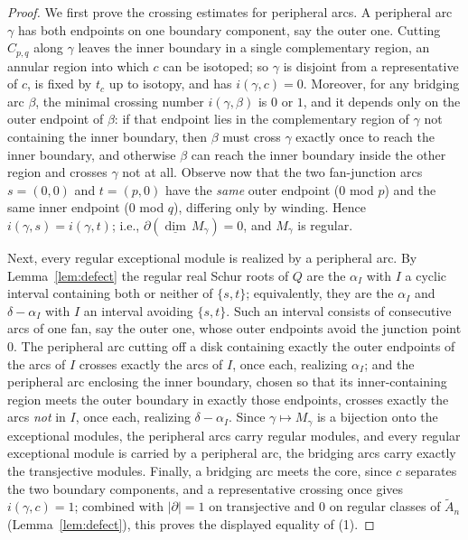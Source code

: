 \documentclass[10pt,a4paper]{amsart}
\begin{document}
\begin{proof}
We first prove the crossing estimates for peripheral arcs. A peripheral
arc $\gamma$ has both endpoints on one boundary component, say the outer
one. Cutting $C_{p, q}$ along $\gamma$ leaves the inner boundary in a
single complementary region, an annular region into which $c$ can be
isotoped; so $\gamma$ is disjoint from a representative of $c$, is fixed
by $t_c$ up to isotopy, and has $i(\gamma, c) = 0$. Moreover, for any
bridging arc $\beta$, the minimal crossing number $i(\gamma, \beta)$ is
$0$ or $1$, and it depends only on the outer endpoint of $\beta$: if that
endpoint lies in the complementary region of $\gamma$ not containing the
inner boundary, then $\beta$ must cross $\gamma$ exactly once to reach
the inner boundary, and otherwise $\beta$ can reach the inner boundary
inside the other region and crosses $\gamma$ not at all. Observe now that
the two fan-junction arcs $s = (0, 0)$ and $t = (p, 0)$ have the
\emph{same} outer endpoint \textup{(}$0$ mod $p$\textup{)} and the same
inner endpoint \textup{(}$0$ mod $q$\textup{)}, differing only by
winding. Hence $i(\gamma, s) = i(\gamma, t)$; i.e.,
$\partial(\underline{\dim}\, M_\gamma) = 0$, and $M_\gamma$ is regular.

Next, every regular exceptional module is realized by a peripheral arc.
By Lemma~\ref{lem:defect} the regular real Schur roots of $Q$ are the
$\alpha_I$ with $I$ a cyclic interval containing both or neither of
$\{s, t\}$; equivalently, they are the $\alpha_I$ and $\delta - \alpha_I$
with $I$ an interval avoiding $\{s, t\}$. Such an interval consists of
consecutive arcs of one fan, say the outer one, whose outer endpoints
avoid the junction point $0$. The peripheral arc cutting off a disk
containing exactly the outer endpoints of the arcs of $I$ crosses exactly
the arcs of $I$, once each, realizing $\alpha_I$; and the peripheral arc
enclosing the inner boundary, chosen so that its inner-containing region
meets the outer boundary in exactly those endpoints, crosses exactly the
arcs \emph{not} in $I$, once each, realizing $\delta - \alpha_I$. Since
$\gamma \mapsto M_\gamma$ is a bijection onto the exceptional modules,
the peripheral arcs carry regular modules, and every regular exceptional
module is carried by a peripheral arc, the bridging arcs carry exactly
the transjective modules. Finally, a bridging arc meets the core, since
$c$ separates the two boundary components, and a representative crossing
once gives $i(\gamma, c) = 1$; combined with $|\partial| = 1$ on
transjective and $0$ on regular classes of $\widetilde{A}_n$
\textup{(}Lemma~\ref{lem:defect}\textup{)}, this proves the displayed
equality of (1).


\end{proof}
\end{document}
